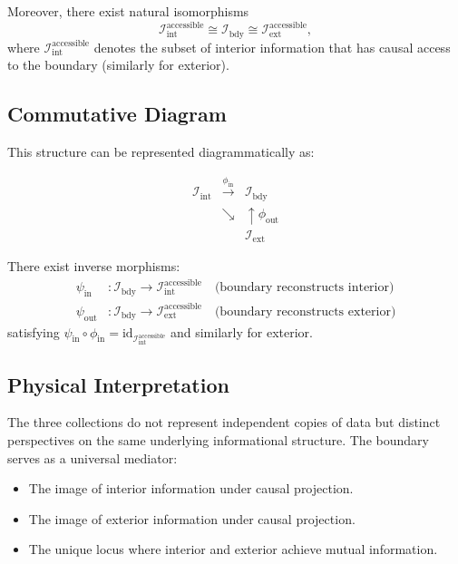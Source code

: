 ﻿\documentclass[12pt]{article}
\begin{document}
Moreover, there exist natural isomorphisms
\[
\mathcal{I}_{\mathrm{int}}^{\mathrm{accessible}} \cong \mathcal{I}_{\mathrm{bdy}} \cong \mathcal{I}_{\mathrm{ext}}^{\mathrm{accessible}},
\]
where $\mathcal{I}_{\mathrm{int}}^{\mathrm{accessible}}$ denotes the subset of interior information that has causal access to the boundary (similarly for exterior).


\subsection{Commutative Diagram}


This structure can be represented diagrammatically as:


\[
\begin{array}{ccc}
\mathcal{I}_{\mathrm{int}} & \xrightarrow{\phi_{\mathrm{in}}} & \mathcal{I}_{\mathrm{bdy}} \\
 & \searrow & \uparrow \phi_{\mathrm{out}} \\
 & & \mathcal{I}_{\mathrm{ext}}
\end{array}
\]


There exist inverse morphisms:
\begin{align*}
    \psi_{\mathrm{in}} &: \mathcal{I}_{\mathrm{bdy}} \to \mathcal{I}_{\mathrm{int}}^{\mathrm{accessible}} \quad \text{(boundary reconstructs interior)} \\
    \psi_{\mathrm{out}} &: \mathcal{I}_{\mathrm{bdy}} \to \mathcal{I}_{\mathrm{ext}}^{\mathrm{accessible}} \quad \text{(boundary reconstructs exterior)}
\end{align*}
satisfying $\psi_{\mathrm{in}} \circ \phi_{\mathrm{in}} = \mathrm{id}_{\mathcal{I}_{\mathrm{int}}^{\mathrm{accessible}}}$ and similarly for exterior.


\subsection{Physical Interpretation}


The three collections do not represent independent copies of data but distinct perspectives on the same underlying informational structure. The boundary serves as a universal mediator:


\begin{itemize}
    \item The image of interior information under causal projection.
    \item The image of exterior information under causal projection.
    \item The unique locus where interior and exterior achieve mutual information.
\end{itemize}
\end{document}
